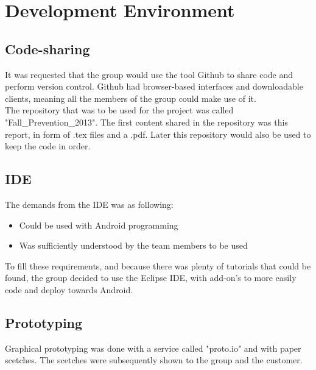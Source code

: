 \chapter{Development Environment}

\section{Code-sharing}
It was requested that the group would use the tool Github to share code and perform version control. Github had browser-based interfaces and downloadable clients, meaning all the members of the group could make use of it. \\
The repository that was to be used for the project was called "Fall\_Prevention\_2013". The first content shared in the repository was this report, in form of .tex files and a .pdf. Later this repository would also be used to keep the code in order. 

\section{IDE}
The demands from the IDE was as following:
\begin{itemize}
\item Could be used with Android programming
\item Was sufficiently understood by the team members to be used
\end{itemize}
To fill these requirements, and because there was plenty of tutorials that could be found, the group decided to use the Eclipse IDE, with add-on's to more easily code and deploy towards Android. 

\section{Prototyping}
Graphical prototyping was done with a service called "proto.io" and with paper scetches. The scetches were subsequently shown to the group and the customer. 